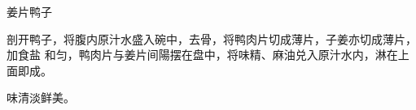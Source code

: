 \begin{recipe}{姜片鸭子}

\ingredients


\cooking

剖开鸭子，将腹内原汁水盛入碗中，去骨，将鸭肉片切成薄片，子姜亦切成薄片，加食盐
和匀，鸭肉片与姜片间陽摆在盘中，将味精、麻油兑入原汁水内，淋在上面即成。

\features

味清淡鲜美。

\end{recipe}

